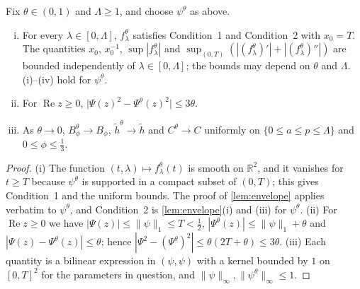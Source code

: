 \documentclass[11pt]{amsart}
\numberwithin{equation}{section}
\theoremstyle{plain}
\theoremstyle{definition}
\theoremstyle{remark}
\newcommand{\RR}{\mathbb{R}}
\renewcommand{\Re}{\operatorname{Re}}
\newcommand{\1}{\mathbf{1}}
\begin{document}
\begin{lemma}\label{lem:smoothing}
Fix $\theta\in(0,1)$ and $\Lambda\ge1$, and choose $\psi^\theta$ as above.
\begin{enumerate}[(i)]
  \item For every $\lambda\in[0,\Lambda]$, $f^\theta_\lambda$ satisfies Condition~1 and
    Condition~2 with $x_0=T$. The quantities $x_0$, $x_0^{-1}$, $\sup|f^\theta_\lambda|$ and
    $\sup_{(0,T)}(|(f^\theta_\lambda)'|+|(f^\theta_\lambda)''|)$ are bounded independently of
    $\lambda\in[0,\Lambda]$; the bounds may depend on $\theta$ and $\Lambda$.
    (i)--(iv) hold for $\psi^\theta$.
  \item For $\Re z\ge0$, $\bigl|\Psi(z)^2-\Psi^\theta(z)^2\bigr|\le3\theta$.
  \item As $\theta\to0$, $B^\theta_\phi\to B_\phi$, $\tilde h^\theta\to\tilde h$ and $C^\theta\to C$ uniformly on
    $\{0\le a\le p\le\Lambda\}$ and $0\le\phi\le\frac13$.
\end{enumerate}
\end{lemma}

\begin{proof}
(i) The function $(t,\lambda)\mapsto f^\theta_\lambda(t)$ is smooth on $\RR^2$, and it vanishes for
$t\ge T$ because $\psi^\theta$ is supported in a compact subset of $(0,T)$; this gives
Condition~1 and the uniform bounds. The proof of \cref{lem:envelope} applies verbatim to
$\psi^\theta$, and Condition~2 is \cref{lem:envelope}(i) and (iii) for $\psi^\theta$.
(ii) For $\Re z\ge0$ we have $|\Psi(z)|\le\|\psi\|_1\le T<\frac12$, $|\Psi^\theta(z)|\le\|\psi\|_1+\theta$
and $|\Psi(z)-\Psi^\theta(z)|\le\theta$; hence $|\Psi^2-(\Psi^\theta)^2|\le\theta(2T+\theta)\le3\theta$.
(iii) Each quantity is a bilinear expression in $(\psi,\psi)$ with a kernel bounded by $1$ on
$[0,T]^2$ for the parameters in question, and $\|\psi\|_\infty,\|\psi^\theta\|_\infty\le1$.
\end{proof}
\end{document}
